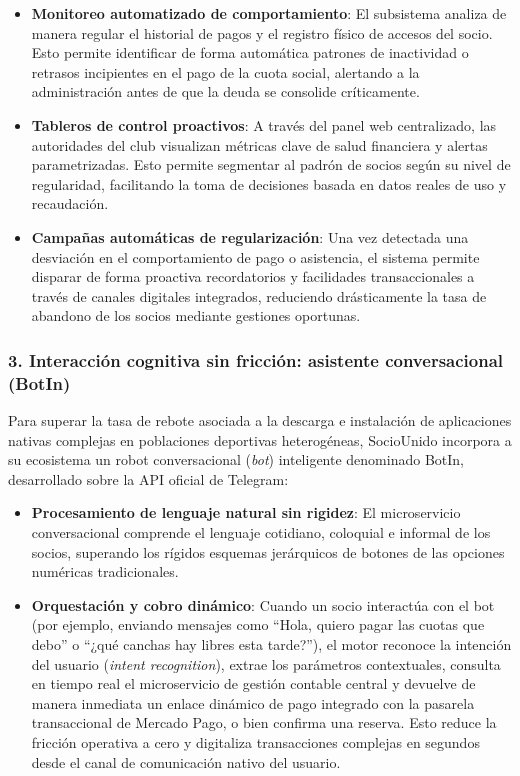 \documentclass[conference, a4paper]{IEEEtran}
\begin{document}
\begin{itemize}
    \item \textbf{Monitoreo automatizado de comportamiento}: El subsistema analiza de manera regular el historial de pagos y el registro f\'isico de accesos del socio. Esto permite identificar de forma autom\'atica patrones de inactividad o retrasos incipientes en el pago de la cuota social, alertando a la administraci\'on antes de que la deuda se consolide cr\'iticamente.
    \item \textbf{Tableros de control proactivos}: A trav\'es del panel web centralizado, las autoridades del club visualizan m\'etricas clave de salud financiera y alertas parametrizadas. Esto permite segmentar al padr\'on de socios seg\'un su nivel de regularidad, facilitando la toma de decisiones basada en datos reales de uso y recaudaci\'on.
    \item \textbf{Campa\~nas autom\'aticas de regularizaci\'on}: Una vez detectada una desviaci\'on en el comportamiento de pago o asistencia, el sistema permite disparar de forma proactiva recordatorios y facilidades transaccionales a trav\'es de canales digitales integrados, reduciendo dr\'asticamente la tasa de abandono de los socios mediante gestiones oportunas.
\end{itemize}

\subsubsection{3. Interacci\'on cognitiva sin fricci\'on: asistente conversacional (BotIn)}
Para superar la tasa de rebote asociada a la descarga e instalaci\'on de aplicaciones nativas complejas en poblaciones deportivas heterog\'eneas, SocioUnido incorpora a su ecosistema un robot conversacional (\textit{bot}) inteligente denominado BotIn, desarrollado sobre la API oficial de Telegram:

\begin{itemize}
    \item \textbf{Procesamiento de lenguaje natural sin rigidez}: El microservicio conversacional comprende el lenguaje cotidiano, coloquial e informal de los socios, superando los r\'igidos esquemas jer\'arquicos de botones de las opciones num\'ericas tradicionales.
    \item \textbf{Orquestaci\'on y cobro din\'amico}: Cuando un socio interact\'ua con el bot (por ejemplo, enviando mensajes como ``Hola, quiero pagar las cuotas que debo'' o ``¿qu\'e canchas hay libres esta tarde?''), el motor reconoce la intenci\'on del usuario (\textit{intent recognition}), extrae los par\'ametros contextuales, consulta en tiempo real el microservicio de gesti\'on contable central y devuelve de manera inmediata un enlace din\'amico de pago integrado con la pasarela transaccional de Mercado Pago, o bien confirma una reserva. Esto reduce la fricci\'on operativa a cero y digitaliza transacciones complejas en segundos desde el canal de comunicaci\'on nativo del usuario.
\end{itemize}
\end{document}

